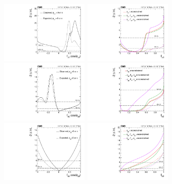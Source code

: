 \begin{figure}
\centering
       \includegraphics[width=0.38\textwidth]{Spin_Parity/fL1_Real.pdf}
       \includegraphics[width=0.38\textwidth]{Spin_Parity/fL1_Profile.pdf} \\
       \includegraphics[width=0.38\textwidth]{Spin_Parity/fa2_Real.pdf}
       \includegraphics[width=0.38\textwidth]{Spin_Parity/fa2_Profile.pdf} \\
       \includegraphics[width=0.38\textwidth]{Spin_Parity/fa3_Real.pdf}
       \includegraphics[width=0.38\textwidth]{Spin_Parity/fa3_Profile.pdf} \\

\end{figure}
